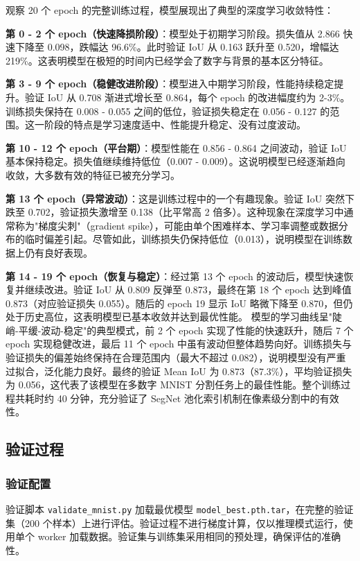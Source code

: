 \documentclass[a4paper]{article}
\begin{document}
观察 20 个 epoch 的完整训练过程，模型展现出了典型的深度学习收敛特性：

\textbf{第 0 - 2 个 epoch（快速降损阶段）}：模型处于初期学习阶段。损失值从 2.866 快速下降至 0.098，跌幅达 96.6\%。此时验证 IoU 从 0.163 跃升至 0.520，增幅达 219\%。这表明模型在极短的时间内已经学会了数字与背景的基本区分特征。

\textbf{第 3 - 9 个 epoch（稳健改进阶段）}：模型进入中期学习阶段，性能持续稳定提升。验证 IoU 从 0.708 渐进式增长至 0.864，每个 epoch 的改进幅度约为 2-3\%。训练损失保持在 0.008 - 0.055 之间的低位，验证损失稳定在 0.056 - 0.127 的范围。这一阶段的特点是学习速度适中、性能提升稳定、没有过度波动。

\textbf{第 10 - 12 个 epoch（平台期）}：模型性能在 0.856 - 0.864 之间波动，验证 IoU 基本保持稳定。损失值继续维持低位（0.007 - 0.009）。这说明模型已经逐渐趋向收敛，大多数有效的特征已被充分学习。

\textbf{第 13 个 epoch（异常波动）}：这是训练过程中的一个有趣现象。验证 IoU 突然下跌至 0.702，验证损失激增至 0.138（比平常高 2 倍多）。这种现象在深度学习中通常称为"梯度尖刺"（gradient spike），可能由单个困难样本、学习率调整或数据分布的临时偏差引起。尽管如此，训练损失仍保持低位（0.013），说明模型在训练数据上仍有良好表现。

\textbf{第 14 - 19 个 epoch（恢复与稳定）}：经过第 13 个 epoch 的波动后，模型快速恢复并继续改进。验证 IoU 从 0.809 反弹至 0.873，最终在第 18 个 epoch 达到峰值 0.873（对应验证损失 0.055）。随后的 epoch 19 显示 IoU 略微下降至 0.870，但仍处于历史高位，这表明模型已基本收敛并达到最优性能。
\tab 模型的学习曲线呈"陡峭-平缓-波动-稳定"的典型模式，前 2 个 epoch 实现了性能的快速跃升，随后 7 个 epoch 实现稳健改进，最后 11 个 epoch 中虽有波动但整体趋势向好。训练损失与验证损失的偏差始终保持在合理范围内（最大不超过 0.082），说明模型没有严重过拟合，泛化能力良好。最终的验证 Mean IoU 为 0.873（87.3\%），平均验证损失为 0.056，这代表了该模型在多数字 MNIST 分割任务上的最佳性能。整个训练过程共耗时约 40 分钟，充分验证了 SegNet 池化索引机制在像素级分割中的有效性。


\subsection{验证过程}

\subsubsection{验证配置}

验证脚本 \texttt{validate\_mnist.py} 加载最优模型 \texttt{model\_best.pth.tar}，在完整的验证集（200 个样本）上进行评估。验证过程不进行梯度计算，仅以推理模式运行，使用单个 worker 加载数据。验证集与训练集采用相同的预处理，确保评估的准确性。
\end{document}
